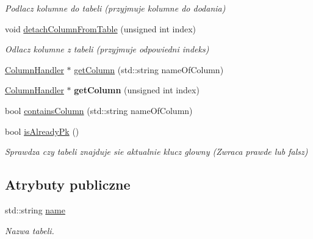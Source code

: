 \begin{DoxyCompactItemize}
\begin{DoxyCompactList}\small\item\em Podlacz kolumne do tabeli (przyjmuje kolumne do dodania) \end{DoxyCompactList}\item 
\mbox{\label{class_table_ac98476e2e556fa3d8c770548cf5db2cf}} 
void \mbox{\hyperlink{class_table_ac98476e2e556fa3d8c770548cf5db2cf}{detach\+Column\+From\+Table}} (unsigned int index)
\begin{DoxyCompactList}\small\item\em Odlacz kolumne z tabeli (przyjmuje odpowiedni indeks) \end{DoxyCompactList}\item 
\mbox{\hyperlink{class_column_handler}{Column\+Handler}} $\ast$ \mbox{\hyperlink{class_table_abf7854a77e6fa5f9421565a2acc34590}{get\+Column}} (std\+::string name\+Of\+Column)
\item 
\mbox{\label{class_table_a411d2032c8134b8e3846a3921e826596}} 
\mbox{\hyperlink{class_column_handler}{Column\+Handler}} $\ast$ {\bfseries get\+Column} (unsigned int index)
\item 
bool \mbox{\hyperlink{class_table_aa6b2d58e79fbfc9e2bc7a3f912c5157c}{contains\+Column}} (std\+::string name\+Of\+Column)
\item 
\mbox{\label{class_table_a47c6260a9a8b769e630a0263f094ecff}} 
bool \mbox{\hyperlink{class_table_a47c6260a9a8b769e630a0263f094ecff}{is\+Already\+Pk}} ()
\begin{DoxyCompactList}\small\item\em Sprawdza czy tabeli znajduje sie aktualnie klucz glowny (Zwraca prawde lub falsz) \end{DoxyCompactList}\end{DoxyCompactItemize}
\subsection*{Atrybuty publiczne}
\begin{DoxyCompactItemize}
\item 
\mbox{\label{class_table_a776e2cab59507b3b59d475a964e347b8}} 
std\+::string \mbox{\hyperlink{class_table_a776e2cab59507b3b59d475a964e347b8}{name}}
\begin{DoxyCompactList}\small\item\em Nazwa tabeli. \end{DoxyCompactList}\end{DoxyCompactItemize}


